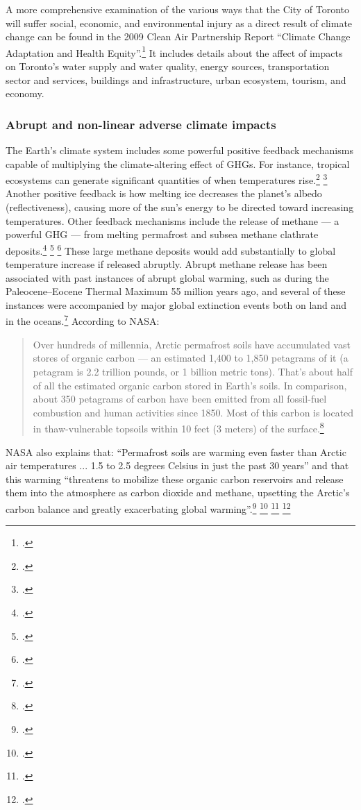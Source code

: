 \documentclass[10pt]{article}
\begin{document}
A more comprehensive examination of the various ways that the City of Toronto will suffer social, economic, and environmental injury as a direct result of climate change can be found in the 2009 Clean Air Partnership Report ``Climate Change Adaptation and Health Equity''.\footcite[][]{CCAHealthEquity}
It includes details about the affect of impacts on Toronto's water supply and water quality, energy sources, transportation sector and services, buildings and infrastructure, urban ecosystem, tourism, and economy.  



	\subsubsection{Abrupt and non-linear adverse climate impacts}



The Earth's climate system includes some powerful positive feedback mechanisms capable of multiplying the climate-altering effect of GHGs.
For instance, tropical ecosystems can generate significant quantities of  when temperatures rise.\footcite[][]{Wang2013} \footcite[See also: ][]{TropicalEcoBoost}
Another positive feedback is how melting ice decreases the planet's albedo (reflectiveness), causing more of the sun's energy to be directed toward increasing temperatures.
Other feedback mechanisms include the release of methane --- a powerful GHG --- from melting permafrost and subsea methane clathrate deposits.\footcite[See: ][]{VastCostsArctic} \footcite[See also: ][]{Thermokast2013} \footcite[See also: ][]{VidalTimebomb}
These large methane deposits would add substantially to global temperature increase if released abruptly.
Abrupt methane release has been associated with past instances of abrupt global warming, such as during the Paleocene–Eocene Thermal Maximum 55 million years ago, and several of these instances were accompanied by major global extinction events both on land and in the oceans.\footcite[See: ][]{Hansen2010}
According to NASA:
\begin{quote}
Over hundreds of millennia, Arctic permafrost soils have accumulated vast stores of organic carbon --- an estimated 1,400 to 1,850 petagrams of it (a petagram is 2.2 trillion pounds, or 1 billion metric tons). That's about half of all the estimated organic carbon stored in Earth's soils. In comparison, about 350 petagrams of carbon have been emitted from all fossil-fuel combustion and human activities since 1850. Most of this carbon is located in thaw-vulnerable topsoils within 10 feet (3 meters) of the surface.\footcite[][]{SleepingGiant}
\end{quote}
NASA also explains that: ``Permafrost soils are warming even faster than Arctic air temperatures ... 1.5 to 2.5 degrees Celsius in just the past 30 years'' and that this warming ``threatens to mobilize these organic carbon reservoirs and release them into the atmosphere as carbon dioxide and methane, upsetting the Arctic's carbon balance and greatly exacerbating global warming''.\footcite[][]{SleepingGiant} \footcite[See also: ][p. 183--6]{Vaks2013} \footcite[][]{15permafrost} \footcite[][]{Bakewell2013}
\end{document}
